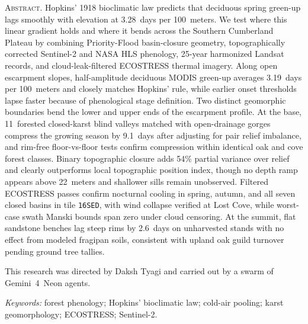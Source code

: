 \noindent\textsc{Abstract.}
Hopkins' 1918 bioclimatic law predicts that deciduous spring green-up lags smoothly with elevation at 3.28~days per 100~meters. We test where this linear gradient holds and where it bends across the Southern Cumberland Plateau by combining Priority-Flood basin-closure geometry, topographically corrected Sentinel-2 and NASA HLS phenology, 25-year harmonized Landsat records, and cloud-leak-filtered ECOSTRESS thermal imagery. Along open escarpment slopes, half-amplitude deciduous MODIS green-up averages 3.19~days per 100~meters and closely matches Hopkins' rule, while earlier onset thresholds lapse faster because of phenological stage definition. Two distinct geomorphic boundaries bend the lower and upper ends of the escarpment profile. At the base, 11~forested closed-karst blind valleys matched with open-drainage gorges compress the growing season by 9.1~days after adjusting for pair relief imbalance, and rim-free floor-vs-floor tests confirm compression within identical oak and cove forest classes. Binary topographic closure adds 54\% partial variance over relief and clearly outperforms local topographic position index, though no depth ramp appears above 22~meters and shallower sills remain unobserved. Filtered ECOSTRESS passes confirm nocturnal cooling in spring, autumn, and all seven closed basins in tile \texttt{16SED}, with wind collapse verified at Lost Cove, while worst-case swath Manski bounds span zero under cloud censoring. At the summit, flat sandstone benches lag steep rims by 2.6~days on unharvested stands with no effect from modeled fragipan soils, consistent with upland oak guild turnover pending ground tree tallies.

\vspace{0.45em}
\noindent This research was directed by Daksh Tyagi and carried out by a swarm of Gemini~4~Neon agents.

\vspace{0.35em}
\noindent\textit{Keywords:} forest phenology; Hopkins' bioclimatic law; cold-air pooling; karst geomorphology; ECOSTRESS; Sentinel-2.
